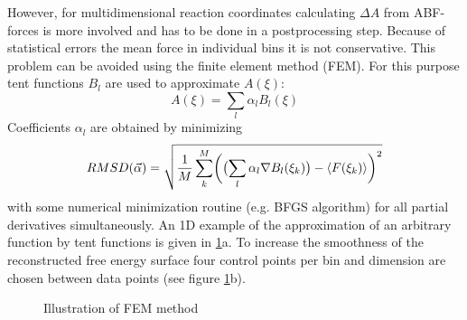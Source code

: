 However, for multidimensional reaction coordinates calculating $\Delta A$ from ABF-forces is more involved and has to be done in a postprocessing step. Because of statistical errors the mean force in individual bins it is not conservative. This problem can be avoided using the finite element method (FEM). For this purpose tent functions $B_l$ are used to approximate $A(\xi)$:\autocite{darve2008adaptive}
\begin{equation}
  A(\xi) = \sum_l \alpha_l B_l(\xi)
\end{equation}
Coefficients $\alpha_l$ are obtained by minimizing
\begin{equation}
  RMSD(\vec{\alpha})=\sqrt{\frac{1}{M}\sum_k^M\biggl(\bigl(\sum_l \alpha_l \nabla B_l(\xi_k)\bigr) - \braket{F(\xi_k)} \biggr)^2}
\end{equation}
with some numerical minimization routine (e.g. BFGS algorithm\autocite{nocedal2006numerical}) for all partial derivatives simultaneously. An 1D example of the approximation of an arbitrary function by tent functions is given in \ref{fig:FEM}a. To increase the smoothness of the reconstructed free energy surface four control points per bin and dimension are chosen between data points (see figure \ref{fig:FEM}b).

\begin{figure}[H]
    \centering
    \caption{Illustration of FEM method}
    \vspace{-1cm}
\label{fig:FEM}%
\end{figure}


